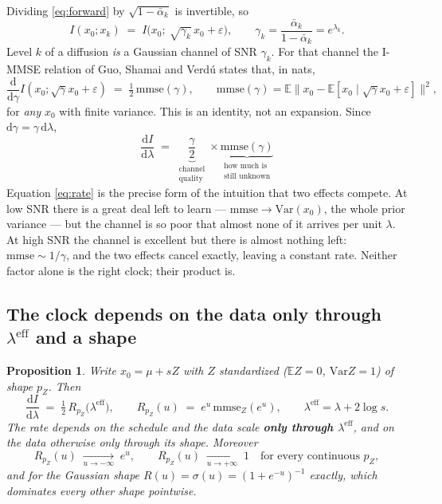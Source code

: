 \documentclass[11pt]{article}
\newtheorem{proposition}{Proposition}
\theoremstyle{definition}
\newcommand{\abar}{\bar\alpha}
\newcommand{\Var}{\mathrm{Var}}
\newcommand{\dd}{\mathrm{d}}
\newcommand{\E}{\mathbb{E}}
\newcommand{\mmse}{\mathrm{mmse}}
\newcommand{\leff}{\lambda^{\mathrm{eff}}}
\begin{document}
Dividing \eqref{eq:forward} by $\sqrt{1-\abar_k}$ is invertible, so
\begin{equation}
  I(x_0;x_k) \;=\; I\big(x_0;\ \sqrt{\gamma_k}\,x_0+\varepsilon\big),
  \qquad \gamma_k=\frac{\abar_k}{1-\abar_k}=e^{\lambda_k}.
  \label{eq:channel}
\end{equation}
Level $k$ of a diffusion \emph{is} a Gaussian channel of SNR $\gamma_k$. For
that channel the I-MMSE relation of Guo, Shamai and Verd\'u
\cite{guo2005mutual} states that, in nats,
\begin{equation}
  \frac{\dd}{\dd\gamma}I(x_0;\sqrt\gamma x_0+\varepsilon)
  \;=\; \tfrac12\,\mmse(\gamma),
  \qquad
  \mmse(\gamma)=\E\big\|x_0-\E[x_0\mid \sqrt\gamma x_0+\varepsilon]\big\|^2,
  \label{eq:immse}
\end{equation}
for \emph{any} $x_0$ with finite variance. This is an identity, not an
expansion. Since $\dd\gamma=\gamma\,\dd\lambda$,
\begin{equation}
  \boxed{\;
  \frac{\dd I}{\dd\lambda}
  \;=\; \underbrace{\frac{\gamma}{2}}_{\substack{\text{channel}\\\text{quality}}}
        \times
        \underbrace{\mmse(\gamma)}_{\substack{\text{how much is}\\\text{still unknown}}}
  \;}
  \label{eq:rate}
\end{equation}
Equation \eqref{eq:rate} is the precise form of the intuition that two effects
compete. At low SNR there is a great deal left to learn --- $\mmse\to\Var(x_0)$,
the whole prior variance --- but the channel is so poor that almost none of it
arrives per unit $\lambda$. At high SNR the channel is excellent but there is
almost nothing left: $\mmse\sim1/\gamma$, and the two effects cancel exactly,
leaving a constant rate. Neither factor alone is the right clock; their product
is.

\subsection{The clock depends on the data only through $\leff$ and a shape}

\begin{proposition}
\label{prop:clock}
Write $x_0=\mu+sZ$ with $Z$ standardized ($\E Z=0$, $\Var Z=1$) of shape $p_Z$.
Then
\begin{equation}
  \frac{\dd I}{\dd\lambda}
  \;=\; \tfrac12\,R_{p_Z}\!\big(\leff\big),
  \qquad
  R_{p_Z}(u)\;=\;e^{u}\,\mmse_Z(e^{u}),
  \qquad \leff=\lambda+2\log s .
  \label{eq:clockdep}
\end{equation}
The rate depends on the schedule and the data scale \textbf{only through
$\leff$}, and on the data otherwise only through its shape. Moreover
\begin{equation}
  R_{p_Z}(u)\;\xrightarrow[u\to-\infty]{}\;e^{u},
  \qquad
  R_{p_Z}(u)\;\xrightarrow[u\to+\infty]{}\;1
  \quad\text{for every continuous }p_Z,
  \label{eq:asympt}
\end{equation}
and for the Gaussian shape $R(u)=\sigma(u)=(1+e^{-u})^{-1}$ exactly, which
dominates every other shape pointwise.
\end{proposition}
\end{document}
